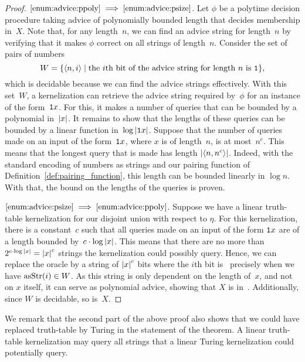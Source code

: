 \begin{proof}
$\ref{enum:advice:ppoly} \implies \ref{enum:advice:psize}$.
  Let $\phi$ be a polytime decision procedure taking advice of polynomially bounded length that decides membership in~$X$.
  Note that, for any length~$n$, we can find an advice string for length~$n$ by verifying that it makes $\phi$ correct on all strings of length~$n$.
  Consider the set of pairs of numbers
  \begin{equation*}
    W = \{{\langle n, i\rangle} \;|\; \text{the $i$th bit of the advice string for length~$n$ is \textnormal{\texttt{1}}}\},
  \end{equation*}
  which is decidable because we can find the advice strings effectively.
  With this set~$W$, a kernelization can retrieve the advice string required by~$\phi$ for an instance of the form~$\textnormal{\texttt{1}}x$.
  For this, it makes a number of queries that can be bounded by a polynomial in~${\lvert x\rvert}$.
  It remains to show that the lengths of these queries can be bounded by a linear function in~$\log {\lvert\textnormal{\texttt{1}}x\rvert}$.
  Suppose that the number of queries made on an input of the form~$\textnormal{\texttt{1}}x$, where $x$ is of length~$n$, is at most~$n^c$.
  This means that the longest query that is made has length ${\lvert{\langle n, n^c\rangle}\rvert}$.
  Indeed, with the standard encoding of numbers as strings and our pairing function of Definition~\ref{def:pairing_function}, this length can be bounded linearly in $\log n$.
  With that, the bound on the lengths of the queries is proven.

$\ref{enum:advice:psize} \implies \ref{enum:advice:ppoly}$.
  Suppose we have a linear truth-table kernelization for our disjoint union with respect to $\eta$.
  For this kernelization, there is a constant~$c$ such that all queries made on an input of the form $\textnormal{\texttt{1}}x$ are of a length bounded by~$c \cdot \log {\lvert x\rvert}$.
  This means that there are no more than $2^{c \cdot \log {\lvert x\rvert}} = {\lvert x\rvert}^c$ strings the kernelization could possibly query.
  Hence, we can replace the oracle by a string of ${\lvert x\rvert}^c$ bits where the $i$th bit is~ precisely when we have $\operatorname{asStr}(i) \in W$.
  As this string is only dependent on the length of~$x$, and not on $x$ itself, it can serve as polynomial advice, showing that $X$ is in~.
  Additionally, since $W$ is decidable, so is~$X$.
\end{proof}

We remark that the second part of the above proof also shows that we could have replaced truth-table by Turing in the statement of the theorem.
A linear truth-table kernelization may query all strings that a linear Turing kernelization could potentially query.


